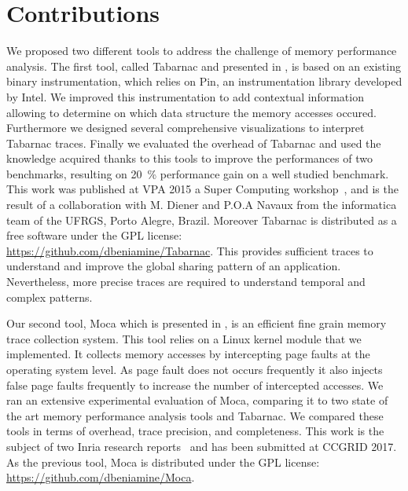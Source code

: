 \section{Contributions}

We proposed two different tools to address the challenge of memory performance analysis.
The first tool, called \gls{Tabarnac} and presented in , is based on an existing binary instrumentation, which relies on \gls{Pin}, an instrumentation library developed by \gls{Intel}.
We improved this instrumentation to add contextual information allowing to determine on which data structure the memory accesses occured.
Furthermore we designed several comprehensive visualizations to interpret \gls{Tabarnac} traces.
Finally we evaluated the overhead of \gls{Tabarnac} and used the knowledge acquired thanks to this tools to improve the performances of two benchmarks, resulting on \SI{20}{\%} performance gain on a well studied benchmark.
This work was published at \gls{VPA} 2015 a Super Computing workshop~\cite{Beniamine15TABARNAC}, and is the result of a collaboration with M. Diener and P.O.A Navaux from the informatica team of the \gls{UFRGS}, Porto Alegre, Brazil.
Moreover \gls{Tabarnac} is distributed as a free software under the \gls{GPL} license:\\
\url{https://github.com/dbeniamine/Tabarnac}.
This provides sufficient traces to understand and improve the global sharing pattern of an application.
Nevertheless, more precise traces are required to understand temporal and complex patterns.

Our second tool, \gls{Moca} which is presented in , is an efficient fine grain memory trace collection system.
This tool relies on a \gls{Linux} kernel module that we implemented.
It collects memory accesses by intercepting page faults at the operating system level.
As page fault does not occurs frequently it also injects false page faults frequently to increase the number of intercepted accesses.
We ran an extensive experimental evaluation of \gls{Moca}, comparing it to two state of the art memory performance analysis tools and \gls{Tabarnac}.
We compared these tools in terms of overhead, trace precision, and completeness.
This work is the subject of two Inria research reports~\cite{Beniamine15Memory,Beniamine16Moca} and has been submitted at \gls{CCGRID} 2017.
As the previous tool, \gls{Moca} is distributed under the \gls{GPL} license:\\
\url{https://github.com/dbeniamine/Moca}.


